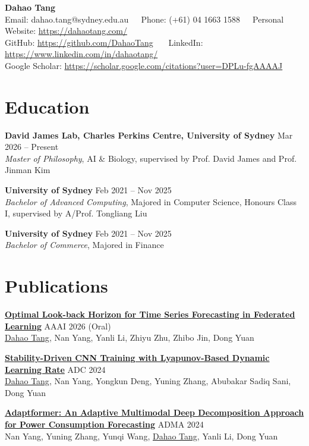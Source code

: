\documentclass[10pt, a4paper]{article}
\makeatletter
\newcommand{\MyNameEN}{Dahao Tang}
\newcommand{\MyEmail}{dahao.tang@sydney.edu.au}
\newcommand{\MyPhone}{(+61) 04 1663 1588}
\newcommand{\MyWebsite}{https://dahaotang.com/}
\newcommand{\MyGitHub}{https://github.com/DahaoTang}
\newcommand{\MyLinkedIn}{https://www.linkedin.com/in/dahaotang/}
\newcommand{\MyGoogleScholar}{https://scholar.google.com/citations?user=DPLu-fgAAAAJ}
\newcommand{\EducationEntry}[4]{
  \noindent \textbf{#1} \hfill #2 \\
  \textit{#3}, #4 \par
  \vspace{4pt}
}
\newcommand{\PublicationEntry}[3]{
  {\raggedright
  \noindent \textbf{#1} \hfill #2 \\
  {\small #3} \par}
  \vspace{4pt}
}
\makeatother
\begin{document}
\begin{center}
  {\Huge \textbf{\MyNameEN}} \\ \vspace{5pt}
  \small
  Email: \MyEmail \ \textbullet \ \ 
  Phone: \MyPhone \ \textbullet \ \
  Personal Website: \href{\MyWebsite}{\MyWebsite} \\
  GitHub: \href{\MyGitHub}{\MyGitHub} \ \textbullet \ \  
  LinkedIn: \href{\MyLinkedIn}{\MyLinkedIn} \\
  Google Scholar: \href{\MyGoogleScholar}{\MyGoogleScholar}
\end{center}

\vspace{-5pt}

\section{Education}

\EducationEntry{David James Lab, Charles Perkins Centre, University of Sydney}{Mar 2026 -- Present}
{Master of Philosophy}{AI \& Biology, supervised by Prof. David James and Prof. Jinman Kim}

\EducationEntry{University of Sydney}
{Feb 2021 -- Nov 2025}
{Bachelor of Advanced Computing}
{Majored in Computer Science, Honours Class I, supervised by A/Prof. Tongliang Liu}

\EducationEntry{University of Sydney}
{Feb 2021 -- Nov 2025}
{Bachelor of Commerce}{Majored in Finance}

\section{Publications}
\PublicationEntry{\href{https://ojs.aaai.org/index.php/AAAI/article/view/39781}{Optimal Look-back Horizon for Time Series Forecasting in Federated Learning}}{AAAI 2026 (Oral)}
{\underline{Dahao Tang}, Nan Yang, Yanli Li, Zhiyu Zhu, Zhibo Jin, Dong Yuan}

\PublicationEntry{\href{https://link.springer.com/chapter/10.1007/978-981-96-1242-0_5}{Stability-Driven CNN Training with Lyapunov-Based Dynamic Learning Rate}}{ADC 2024}
{\underline{Dahao Tang}, Nan Yang, Yongkun Deng, Yuning Zhang, Abubakar Sadiq Sani, Dong Yuan}

\PublicationEntry{\href{https://link.springer.com/chapter/10.1007/978-981-96-0847-8_4}{Adaptformer: An Adaptive Multimodal Deep Decomposition Approach for Power Consumption Forecasting}}{ADMA 2024}
{Nan Yang, Yuning Zhang, Yunqi Wang, \underline{Dahao Tang}, Yanli Li, Dong Yuan}
\end{document}
